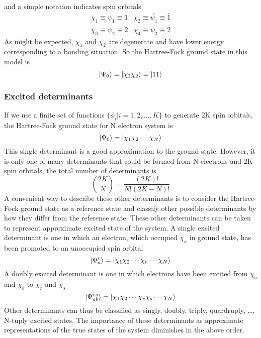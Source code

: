 \documentclass[11pt]{article}
\begin{document}
and a simple notation indicates spin orbitals
\begin{equation}
    \begin{matrix}
        \chi_1\equiv\psi_1\equiv1 &  \chi_2\equiv\bar{\psi_1}\equiv\bar{1}\\
        \chi_3\equiv\psi_2\equiv2 &  \chi_4\equiv\bar{\psi_2}\equiv\bar{2}
    \end{matrix}
\end{equation}
As might be expected, $\chi_1$ and $\chi_2$ are degenerate and have lower energy corresponding to a
bonding situation. So the Hartree-Fock ground state in this model is
\begin{equation}
    \ket{\Psi_0}=\ket{\chi_1\chi_2}=\ket{1\bar{1}}
\end{equation}
\subsubsection{Excited determinants}
If we use a finite set of functions $\{\phi_i|i=1,2,\ldots,K\}$ to generate 2K spin
orbitals, the Hartree-Fock ground state for N electron system is
\begin{equation}
    \ket{\Psi_0}=\ket{\chi_1\chi_2\cdots\chi_N}
\end{equation}
This single determinant is a good approximation to the ground state. However, it is only one of many
determinants that could be formed from N electrons and 2K spin orbitals, the total number of determinants
is
\begin{equation}
    \binom{2K}{N}=\frac{(2K)!}{N!(2K-N)!}
\end{equation}
A convenient way to describe these other determinants is to consider the Hartree-Fock ground state as
a reference state and classify other possible determinants by how they differ from the reference
state. These other determinants can be taken to represent approximate excited state of the system.
A single excited determinant is one in which an electron, which occupied $\chi_a$ in ground state, has
been promoted to an unoccupied spin orbital
\begin{equation}
    \ket{\Psi^r_a}=\ket{\chi_1\chi_2\cdots\chi_r\cdots\chi_N}
\end{equation}
A doubly excited determinant is one in which electrons have been excited from $\chi_a$ and $\chi_b$ to
$\chi_r$ and $\chi_s$
\begin{equation}
    \ket{\Psi^{rs}_{ab}}=\ket{\chi_1\chi_2\cdots\chi_r\chi_s\cdots\chi_N}
\end{equation}
Other determinants can thus be classified as singly, doubly, triply, quardruply, \ldots, N-tuply excited
states. The importance of these determinants as approximate representations of the true states of the
system diminishes in the above order.
\end{document}
